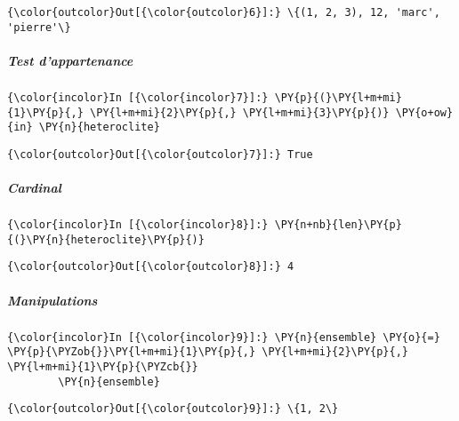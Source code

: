 \begin{Verbatim}[commandchars=\\\{\}]
{\color{outcolor}Out[{\color{outcolor}6}]:} \{(1, 2, 3), 12, 'marc', 'pierre'\}
\end{Verbatim}
            
    \hypertarget{test-dappartenance}{%
\subparagraph{Test d'appartenance}\label{test-dappartenance}}

    \begin{Verbatim}[commandchars=\\\{\}]
{\color{incolor}In [{\color{incolor}7}]:} \PY{p}{(}\PY{l+m+mi}{1}\PY{p}{,} \PY{l+m+mi}{2}\PY{p}{,} \PY{l+m+mi}{3}\PY{p}{)} \PY{o+ow}{in} \PY{n}{heteroclite}
\end{Verbatim}


\begin{Verbatim}[commandchars=\\\{\}]
{\color{outcolor}Out[{\color{outcolor}7}]:} True
\end{Verbatim}
            
    \hypertarget{cardinal}{%
\subparagraph{Cardinal}\label{cardinal}}

    \begin{Verbatim}[commandchars=\\\{\}]
{\color{incolor}In [{\color{incolor}8}]:} \PY{n+nb}{len}\PY{p}{(}\PY{n}{heteroclite}\PY{p}{)}
\end{Verbatim}


\begin{Verbatim}[commandchars=\\\{\}]
{\color{outcolor}Out[{\color{outcolor}8}]:} 4
\end{Verbatim}
            
    \hypertarget{manipulations}{%
\subparagraph{Manipulations}\label{manipulations}}

    \begin{Verbatim}[commandchars=\\\{\}]
{\color{incolor}In [{\color{incolor}9}]:} \PY{n}{ensemble} \PY{o}{=} \PY{p}{\PYZob{}}\PY{l+m+mi}{1}\PY{p}{,} \PY{l+m+mi}{2}\PY{p}{,} \PY{l+m+mi}{1}\PY{p}{\PYZcb{}}
        \PY{n}{ensemble}
\end{Verbatim}


\begin{Verbatim}[commandchars=\\\{\}]
{\color{outcolor}Out[{\color{outcolor}9}]:} \{1, 2\}
\end{Verbatim}
            
